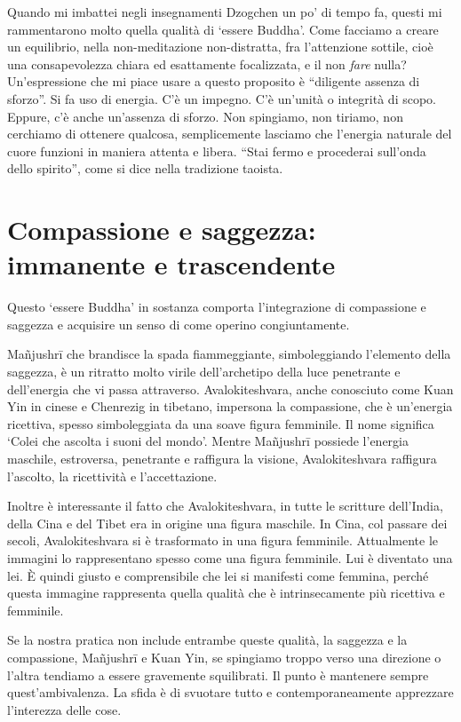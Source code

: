 Quando mi imbattei negli insegnamenti Dzogchen un po' di tempo fa, questi mi rammentarono molto quella qualità di `essere Buddha'. Come facciamo a creare un equilibrio, nella non-meditazione non-distratta, fra l'attenzione sottile, cioè una consapevolezza chiara ed esattamente focalizzata, e il non \textit{fare} nulla? Un'espressione che mi piace usare a questo proposito è ``diligente assenza di sforzo''. Si fa uso di energia. C'è un impegno. C'è un'unità o integrità di scopo. Eppure, c'è anche un'assenza di sforzo. Non spingiamo, non tiriamo, non cerchiamo di ottenere qualcosa, semplicemente lasciamo che l'energia naturale del cuore funzioni in maniera attenta e libera. ``Stai fermo e procederai sull'onda dello spirito'', come si dice nella tradizione taoista.

\section*{Compassione e saggezza: immanente e trascendente}

Questo `essere Buddha' in sostanza comporta l'integrazione di compassione e saggezza e acquisire un senso di come operino congiuntamente. 

Mañjushrī che brandisce la spada fiammeggiante, simboleggiando l'elemento della saggezza, è un ritratto molto virile dell'archetipo della luce penetrante e dell'energia che vi passa attraverso. Avalokiteshvara, anche conosciuto come Kuan Yin in cinese e Chenrezig in tibetano, impersona la compassione, che è un'energia ricettiva, spesso simboleggiata da una soave figura femminile. Il nome significa `Colei che ascolta i suoni del mondo'. Mentre Mañjushrī possiede l'energia maschile, estroversa, penetrante e raffigura la visione, Avalokiteshvara raffigura l'ascolto, la ricettività e l'accettazione.

Inoltre è interessante il fatto che Avalokiteshvara, in tutte le scritture dell'India, della Cina e del Tibet era in origine una figura maschile. In Cina, col passare dei secoli, Avalokiteshvara si è trasformato in una figura femminile. Attualmente le immagini lo rappresentano spesso come una figura femminile. Lui è diventato una lei. È quindi giusto e comprensibile che lei si manifesti come femmina, perché questa immagine rappresenta quella qualità che è intrinsecamente più ricettiva e femminile.

Se la nostra pratica non include entrambe queste qualità, la saggezza e la compassione, Mañjushrī e Kuan Yin, se spingiamo troppo verso una direzione o l'altra tendiamo a essere gravemente squilibrati. Il punto è mantenere sempre quest'ambivalenza. La sfida è di svuotare tutto e contemporaneamente apprezzare l'interezza delle cose.

